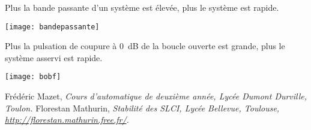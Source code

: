 \noindent\begin{minipage}[c]{.48\linewidth}
\begin{resultat}
Plus la bande passante d'un système est élevée, plus le système est rapide.
\end{resultat}

\begin{center}
\texttt{[image: bandepassante]}
\end{center}

\end{minipage} \hfill
\begin{minipage}[c]{.48\linewidth}
\begin{resultat}
Plus la pulsation de coupure à \SI{0}{dB} de la boucle ouverte est grande, plus le système asservi est rapide.
\end{resultat}


\begin{center}
\texttt{[image: bobf]}
\end{center}
\end{minipage}



%
%
%
%
%
%



\begin{thebibliography}{2}
    Frédéric Mazet, {\it Cours d'automatique de deuxième année, Lycée Dumont Durville, Toulon.}
       Florestan Mathurin, {\it Stabilité des SLCI, Lycée Bellevue, Toulouse, \url{http://florestan.mathurin.free.fr/}.}



\end{thebibliography}





